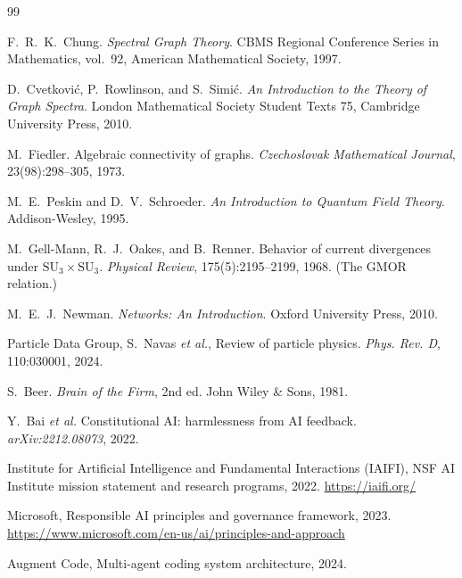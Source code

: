 \documentclass[11pt,a4paper]{amsart}
\theoremstyle{remark}
\begin{document}
\begin{thebibliography}{99}

F.~R.~K.~Chung.
\emph{Spectral Graph Theory}.
CBMS Regional Conference Series in Mathematics, vol.~92,
American Mathematical Society, 1997.

D.~Cvetkovi\'c, P.~Rowlinson, and S.~Simi\'c.
\emph{An Introduction to the Theory of Graph Spectra}.
London Mathematical Society Student Texts 75,
Cambridge University Press, 2010.

M.~Fiedler.
Algebraic connectivity of graphs.
\emph{Czechoslovak Mathematical Journal}, 23(98):298--305, 1973.

M.~E.~Peskin and D.~V.~Schroeder.
\emph{An Introduction to Quantum Field Theory}.
Addison-Wesley, 1995.

M.~Gell-Mann, R.~J.~Oakes, and B.~Renner.
Behavior of current divergences under $\mathrm{SU}_3 \times \mathrm{SU}_3$.
\emph{Physical Review}, 175(5):2195--2199, 1968. (The GMOR relation.)

M.~E.~J.~Newman.
\emph{Networks: An Introduction}.
Oxford University Press, 2010.

Particle Data Group,
S.~Navas \emph{et al.},
Review of particle physics.
\emph{Phys. Rev. D}, 110:030001, 2024.

S.~Beer.
\emph{Brain of the Firm}, 2nd ed.
John Wiley \& Sons, 1981.

Y.~Bai \emph{et al.}
Constitutional AI: harmlessness from AI feedback.
\emph{arXiv:2212.08073}, 2022.

Institute for Artificial Intelligence and Fundamental Interactions (IAIFI),
NSF AI Institute mission statement and research programs, 2022.
\url{https://iaifi.org/}

Microsoft,
Responsible AI principles and governance framework, 2023.
\url{https://www.microsoft.com/en-us/ai/principles-and-approach}

Augment Code,
Multi-agent coding system architecture, 2024.

\end{thebibliography}
\end{document}
